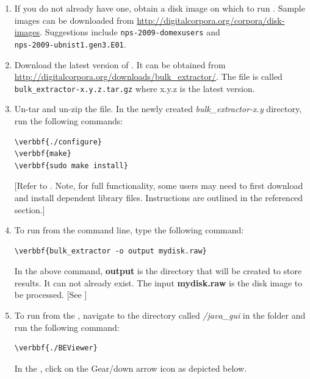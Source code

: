 \documentclass[11pt]{article} %
\begin{document}
\begin{enumerate}
\item If you do not already have one, obtain a disk image on which to run \bulk. Sample images can be downloaded from \url{http://digitalcorpora.org/corpora/disk-images}. Suggestions include \texttt{nps-2009-domexusers} and \\ \texttt{nps-2009-ubnist1.gen3.E01}.
\item Download the latest version of \bulk. It can be obtained from \url{http://digitalcorpora.org/downloads/bulk_extractor/}. The file is called \texttt{bulk\_extractor-x.y.z.tar.gz} where x.y.z is the latest version. 

\item Un-tar and un-zip the file.  In the newly created \textit{bulk\_extractor-x.y} directory, run the following commands:

\begin{Verbatim}[commandchars=\\\{\}]
\verbbf{./configure}
\verbbf{make}
\verbbf{sudo make install}
\end{Verbatim}
[Refer to \textbf{} \textbf{}. Note, for full functionality, some users may need to first download and install dependent library files. Instructions are outlined in the referenced section.]

\item To run \bulk from the command line, type the following command:
\begin{Verbatim}[commandchars=\\\{\}]
\verbbf{bulk_extractor -o output mydisk.raw}
\end{Verbatim} 

In the above command, \textbf{output} is the directory that will be created to store \bulk results.  It can not already exist. The input \textbf{mydisk.raw} is the disk image to be processed.
[See  \textbf{} \textbf{}]

\item To run \bulk from the \viewer, navigate to the directory called \textit{/java\_gui} in the \bulk folder and run the following command:
\begin{Verbatim}[commandchars=\\\{\}]
\verbbf{./BEViewer}
\end{Verbatim}

In the \viewer, click on the Gear/down arrow icon as depicted below.
 

\end{enumerate}
\end{document}
